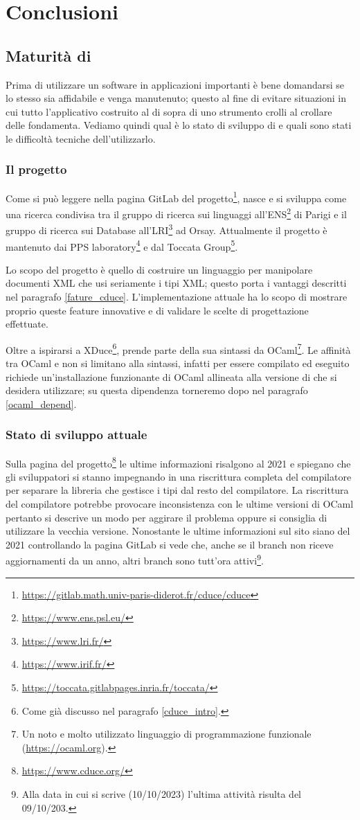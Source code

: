 \chapter{Conclusioni}
\section{Maturità di \cduce}
Prima di utilizzare un software in applicazioni importanti è bene domandarsi se lo stesso sia affidabile e venga manutenuto; questo al fine di evitare situazioni in cui tutto l'applicativo costruito al di sopra di uno strumento crolli al crollare delle fondamenta. Vediamo quindi qual è lo stato di sviluppo di \cduce e quali sono stati le difficoltà tecniche dell'utilizzarlo.
\subsection{Il progetto \cduce}
Come si può leggere nella pagina GitLab del progetto\footnote{\url{https://gitlab.math.univ-paris-diderot.fr/cduce/cduce}}, \cduce nasce e si sviluppa come una ricerca condivisa tra il gruppo di ricerca sui linguaggi all'ENS\footnote{\url{https://www.ens.psl.eu/}} di Parigi e il gruppo di ricerca sui Database all'LRI\footnote{\url{https://www.lri.fr/}} ad Orsay. Attualmente il progetto è mantenuto dai PPS laboratory\footnote{\url{https://www.irif.fr/}} e dal  Toccata Group\footnote{\url{https://toccata.gitlabpages.inria.fr/toccata/}}.

Lo scopo del progetto è quello di costruire un linguaggio per manipolare documenti XML che usi seriamente i tipi XML; questo porta i vantaggi descritti nel paragrafo \ref{fature_cduce}. L'implementazione attuale ha lo scopo di mostrare proprio queste feature innovative e di validare le scelte di progettazione effettuate.

Oltre a ispirarsi a XDuce\footnote{Come già discusso nel paragrafo \ref{cduce_intro}.}, \cduce prende parte della sua sintassi da OCaml\footnote{Un noto e molto utilizzato linguaggio di programmazione funzionale (\url{https://ocaml.org}).}. Le affinità tra OCaml e \cduce non si limitano alla sintassi, infatti per essere compilato ed eseguito \cduce richiede un'installazione funzionante di OCaml allineata alla versione di \cduce che si desidera utilizzare; su questa dipendenza torneremo dopo nel paragrafo \ref{ocaml_depend}.
\subsection{Stato di sviluppo attuale}
Sulla pagina del progetto\footnote{\url{https://www.cduce.org/}} le ultime informazioni risalgono al 2021 e spiegano che gli sviluppatori si stanno impegnando in una riscrittura completa del compilatore per separare la libreria che gestisce i tipi dal resto del compilatore. La riscrittura del compilatore potrebbe provocare inconsistenza con le ultime versioni di OCaml pertanto si descrive un modo per aggirare il problema oppure si consiglia di utilizzare la vecchia versione. Nonostante le ultime informazioni sul sito siano del 2021 controllando la pagina GitLab si vede che, anche se il branch  non riceve aggiornamenti da un anno, altri branch sono tutt'ora attivi\footnote{Alla data in cui si scrive (10/10/2023) l'ultima attività risulta del 09/10/203.}.
